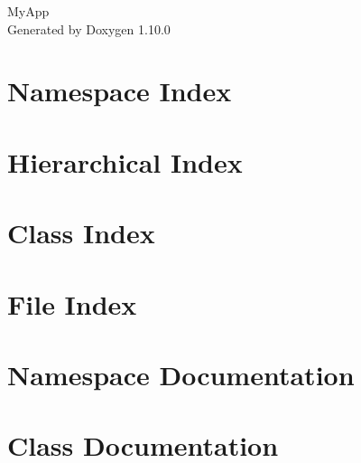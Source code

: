 \documentclass[twoside]{book}
\newcommand{\+}{\discretionary{\mbox{\scriptsize$\hookleftarrow$}}{}{}}
\newcommand{\clearemptydoublepage}{%
    \newpage{\pagestyle{empty}\cleardoublepage}%
  }
\begin{document}
  \raggedbottom
    \hypersetup{pageanchor=false,
                bookmarksnumbered=true,
                pdfencoding=unicode
               }
  \begin{titlepage}
  \vspace*{7cm}
  \begin{center}%
  {\Large My\+App}\\
  \vspace*{1cm}
  {\large Generated by Doxygen 1.10.0}\\
  \end{center}
  \end{titlepage}
  \clearemptydoublepage
  \tableofcontents
  \clearemptydoublepage
  \hypersetup{pageanchor=true}
\chapter{Namespace Index}

\chapter{Hierarchical Index}

\chapter{Class Index}

\chapter{File Index}

\chapter{Namespace Documentation}








\chapter{Class Documentation}















\end{document}
